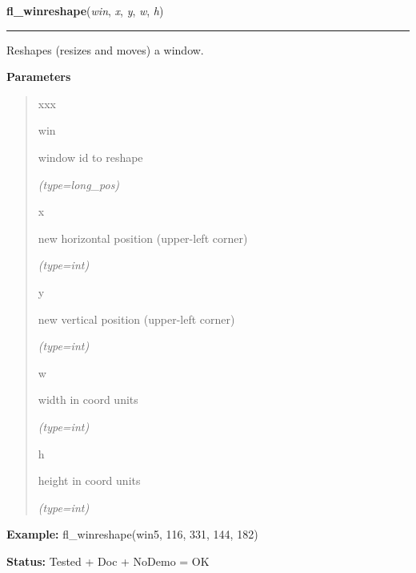 \hspace{.8\funcindent}\begin{boxedminipage}{\funcwidth}

    \raggedright \textbf{fl\_winreshape}(\textit{win}, \textit{x}, \textit{y}, \textit{w}, \textit{h})

    \vspace{-1.5ex}

    \rule{\textwidth}{0.5\fboxrule}
\setlength{\parskip}{2ex}
    Reshapes (resizes and moves) a window.

\setlength{\parskip}{1ex}
      \textbf{Parameters}
      \vspace{-1ex}

      \begin{quote}
        \begin{Ventry}{xxx}

          \item[win]

          window id to reshape

            {\it (type=long\_pos)}

          \item[x]

          new horizontal position (upper-left corner)

            {\it (type=int)}

          \item[y]

          new vertical position (upper-left corner)

            {\it (type=int)}

          \item[w]

          width in coord units

            {\it (type=int)}

          \item[h]

          height in coord units

            {\it (type=int)}

        \end{Ventry}

      \end{quote}

\textbf{Example:} fl\_winreshape(win5, 116, 331, 144, 182)



\textbf{Status:} Tested + Doc + NoDemo = OK



    \end{boxedminipage}

